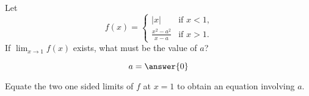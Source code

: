 \documentclass{ximera}
\author{Steven Gubkin}
\begin{document}
\begin{exercise}

Let
\[
f(x) = \begin{cases}
  |x| &\text{if $x<1$,} \\
  \frac{x^2-a^2}{x-a} &\text{if $x>1$.}
\end{cases}
\]
If $\lim_{x \to 1} f(x)$ exists, what must be the value of $a$?
\begin{prompt}
  \[
a = \answer{0}
\]
\end{prompt}
\begin{hint}
  Equate the two one sided limits of $f$ at $x=1$ to obtain an equation involving $a$.
\end{hint}

\end{exercise}
\end{document}
